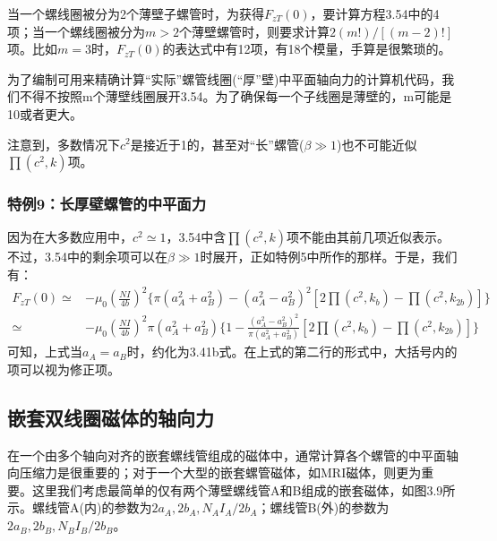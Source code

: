 当一个螺线圈被分为2个薄壁子螺管时，为获得$F_{zT}(0)$，要计算方程3.54中的4项；当一个螺线圈被分为$m>2$个薄壁螺管时，则要求计算$2(m!)/[(m−2)!]$项。比如$m=3$时，$F_{zT}(0)$的表达式中有12项，有18个模量，手算是很繁琐的。

为了编制可用来精确计算“实际”螺管线圈(“厚”壁)中平面轴向力的计算机代码，我们不得不按照m个薄壁线圈展开3.54。为了确保每一个子线圈是薄壁的，m可能是10或者更大。

注意到，多数情况下$c^2$是接近于1的，甚至对“长”螺管($\beta\gg 1$)也不可能近似$\prod(c^2,k)$项。

\subsubsection{特例9：长厚壁螺管的中平面力}
因为在大多数应用中，$c^2\simeq 1$，3.54中含$\prod{(c^2,k)}$项不能由其前几项近似表示。不过，3.54中的剩余项可以在$\beta \gg 1$时展开，正如特例5中所作的那样。于是，我们有：
\begin{equation}
\begin{split}
F_{zT}(0)\simeq& -\mu_0 (\frac{N I}{4b})^2\{ \pi(a_A^2+a_B^2)-(a_A^2-a_B^2)^2[2\prod(c^2,k_b)-\prod(c^2,k_{2b})]\}  \\
\simeq& -\mu_0 (\frac{N I}{4b})^2 \pi(a_A^2+a_B^2) \{ 1-\frac{(a_A^2-a_B^2)^2}{\pi(a_A^2+a_B^2)}[2\prod(c^2,k_b)-\prod(c^2,k_{2b})]\}
\end{split}
\end{equation}
可知，上式当$a_A=a_B$时，约化为3.41b式。在上式的第二行的形式中，大括号内的项可以视为修正项。

\subsection{嵌套双线圈磁体的轴向力}
在一个由多个轴向对齐的嵌套螺线管组成的磁体中，通常计算各个螺管的中平面轴向压缩力是很重要的；对于一个大型的嵌套螺管磁体，如MRI磁体，则更为重要。这里我们考虑最简单的仅有两个薄壁螺线管A和B组成的嵌套磁体，如图3.9所示。螺线管A(内)的参数为$2a_A,2b_A,N_A I_A/2b_A$；螺线管B(外)的参数为$2a_B, 2b_B, N_B I_B/2b_B$。
